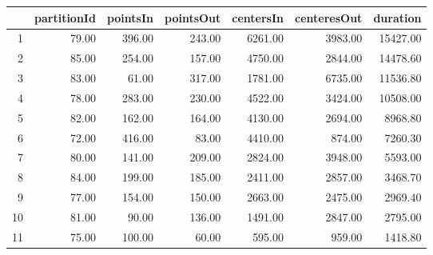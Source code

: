 \begin{table}[ht]
\centering
\begin{tabular}{rrrrrrr}
  \hline
 & partitionId & pointsIn & pointsOut & centersIn & centeresOut & duration \\ 
  \hline
1 & 79.00 & 396.00 & 243.00 & 6261.00 & 3983.00 & 15427.00 \\ 
  2 & 85.00 & 254.00 & 157.00 & 4750.00 & 2844.00 & 14478.60 \\ 
  3 & 83.00 & 61.00 & 317.00 & 1781.00 & 6735.00 & 11536.80 \\ 
  4 & 78.00 & 283.00 & 230.00 & 4522.00 & 3424.00 & 10508.00 \\ 
  5 & 82.00 & 162.00 & 164.00 & 4130.00 & 2694.00 & 8968.80 \\ 
  6 & 72.00 & 416.00 & 83.00 & 4410.00 & 874.00 & 7260.30 \\ 
  7 & 80.00 & 141.00 & 209.00 & 2824.00 & 3948.00 & 5593.00 \\ 
  8 & 84.00 & 199.00 & 185.00 & 2411.00 & 2857.00 & 3468.70 \\ 
  9 & 77.00 & 154.00 & 150.00 & 2663.00 & 2475.00 & 2969.40 \\ 
  10 & 81.00 & 90.00 & 136.00 & 1491.00 & 2847.00 & 2795.00 \\ 
  11 & 75.00 & 100.00 & 60.00 & 595.00 & 959.00 & 1418.80 \\ 
   \hline
\end{tabular}
\end{table}
